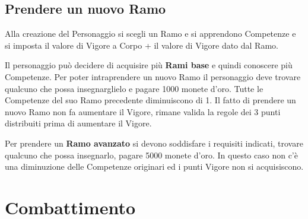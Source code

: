 \documentclass[12pt,a4paper,twoside,openany]{book}
\begin{document}
\begin{multicols}{2}
\subsection{Prendere un nuovo Ramo}

Alla creazione del Personaggio si scegli un Ramo e si apprendono Competenze e si imposta il valore di Vigore a Corpo + il valore di Vigore dato dal Ramo.

Il personaggio può decidere di acquisire più \textbf{Rami base} e quindi conoscere più Competenze. Per poter intraprendere un nuovo Ramo il personaggio deve trovare qualcuno che possa insegnarglielo e pagare 1000 monete d'oro. Tutte le Competenze del suo Ramo precedente diminuiscono di 1.
Il fatto di prendere un nuovo Ramo non fa aumentare il Vigore, rimane valida la regole dei 3 punti distribuiti prima di aumentare il Vigore.

Per prendere un \textbf{Ramo avanzato} si devono soddisfare i requisiti indicati, trovare qualcuno che possa insegnarlo, pagare 5000 monete d'oro. In questo caso non c'è una diminuzione delle Competenze originari ed i punti Vigore non si acquisiscono.


\end{multicols}

\pagebreak

\section{Combattimento}\label{Combattimento}\hypertarget{Combattimento}{}
\end{document}

